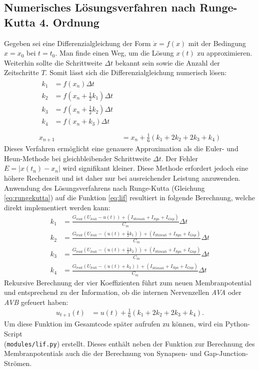 	\subsection*{Numerisches Lösungsverfahren nach Runge-Kutta 4. Ordnung}
		Gegeben sei eine Differenzialgleichung der Form $\dot{x} = f(x)$ mit der Bedingung $x = x_0$ bei $t = t_0$. Man finde einen Weg, um die Lösung $x(t)$ zu approximieren.\\
		Weiterhin sollte die Schrittweite $\Delta t$ bekannt sein sowie die Anzahl der Zeitschritte $T$. Somit lässt sich die Differenzialgleichung numerisch lösen:
		\begin{align}
			\begin{split}
			\label{eq:rungekutta}
			k_1 &= f(x_n) \Delta t\\
			k_2 &= f(x_n + \tfrac{1}{2} k_1) \Delta t\\
			k_3 &= f(x_n + \tfrac{1}{2} k_2) \Delta t\\
			k_4 &= f(x_n + k_3) \Delta t\\
			\end{split}\\[10pt]
			x_{n+1} &= x_n + \tfrac{1}{6} (k_1 + 2 k_2 + 2 k_3 + k_4)
		\end{align}
		Dieses Verfahren ermöglicht eine genauere Approximation als die Euler- und Heun-Methode bei gleichbleibender Schrittweite $\Delta t$. Der Fehler $E = |x(t_n)-x_n|$ wird signifikant kleiner. Diese Methode erfordert jedoch eine höhere Rechenzeit und ist daher nur bei ausreichender Leistung anzuwenden.
	Anwendung des Lösungsverfahrens nach Runge-Kutta (Gleichung \eqref{eq:rungekutta}) auf die Funktion \eqref{eq:lif} resultiert in folgende Berechnung, welche direkt implementiert werden kann:
	\begin{equation}
	\begin{split}
		\label{eq:runkgekutta_nn}
		k_1 &= \frac{G_{leak} (U_{leak} - u(t)) + (I_{Stimuli} + I_{Syn} + I_{Gap})}{C_m} \Delta t\\
		k_2 &= \frac{G_{leak} (U_{leak} - (u(t) + \tfrac{1}{2} k_1)) + (I_{Stimuli} + I_{Syn} + I_{Gap})}{C_m} \Delta t\\
		k_3 &= \frac{G_{leak} (U_{leak} - (u(t) + \tfrac{1}{2} k_2)) + (I_{Stimuli} + I_{Syn} + I_{Gap})}{C_m} \Delta t\\
		k_4 &= \frac{G_{leak} (U_{leak} - (u(t) + k_3)) + (I_{Stimuli} + I_{Syn} + I_{Gap})}{C_m} \Delta t
	\end{split}
	\end{equation}
	\newpage
	Rekursive Berechnung der vier Koeffizienten führt zum neuen Membranpotential und entsprechend zu der Information, ob die internen Nervenzellen \textit{AVA} oder \textit{AVB} gefeuert haben:
	\begin{align}
		\label{eq:runkgekutta_erg}
		u_{t+1}(t) &= u(t) + \tfrac{1}{6} (k_1 + 2 k_2 + 2 k_3 + k_4).
	\end{align}
	Um diese Funktion im Gesamtcode später aufrufen zu können, wird ein Python-Script\\(\texttt{modules/lif.py}) erstellt. Dieses enthält neben der Funktion zur Berechnung des Membranpotentials auch die der Berechnung von Synapsen- und Gap-Junction-Strömen.
	
